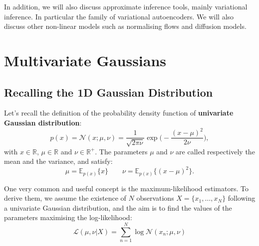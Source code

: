In addition, we will also discuss approximate inference tools, mainly variational inference. In particular the family of variational autoencoders. We will also discuss other non-linear models such as normalising flows and diffusion models.



\section{Multivariate Gaussians}

\subsection{Recalling the 1D Gaussian Distribution}

Let's recall the definition of the probability density function of \textbf{univariate Gaussian distribution}:
\begin{equation}
p(x) = \mathcal{N}(x;\mu,\nu) = \frac{1}{\sqrt{2\pi\nu}}\exp\Big(-\frac{(x-\mu)^2}{2\nu}\Big), 
\end{equation}
with $x\in\mathbb{R}$, $\mu\in\mathbb{R}$ and $\nu\in\mathbb{R}^{+}$. The parameters $\mu$ and $\nu$ are called respectively the mean and the variance, and satisfy:
\begin{equation}
 \mu = \mathbb{E}_{p(x)}\{x\} \qquad \nu = \mathbb{E}_{p(x)}\{(x-\mu)^2\}.
\end{equation}


One very common and useful concept is the maximum-likelihood estimators. To derive them, we assume the existence of $N$ observations $X=\{x_1,\ldots,x_N\}$ following a univariate Gaussian distribution, and the aim is to find the values of the parameters maximising the log-likelihood:
\begin{equation}
\mathcal{L}(\mu,\nu|X) = \sum_{n=1}^N \log \mathcal{N}(x_n;\mu,\nu)
\end{equation}


